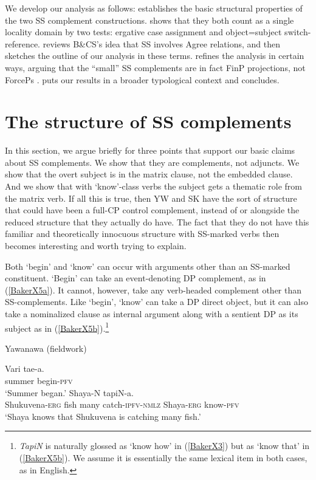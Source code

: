 \documentclass[output=paper]{langscibook}
\begin{document}
We develop our analysis as follows:  establishes the basic structural properties of the two SS complement constructions.  shows that they both count as a single locality domain by two tests: ergative case assignment and object=subject switch-re\-fer\-ence.  reviews B\&CS’s idea that SS involves Agree relations, and then sketches the outline of our analysis in these terms.  refines the analysis in certain ways, arguing that the “small” SS complements are in fact FinP projections, not ForcePs \citep{rizzi1997fine}.  puts our results in a broader typological context and concludes.

\section{The structure of SS complements}\label{sec:baker:2}

In this section, we argue briefly for three points that support our basic claims about SS complements. We show that they are complements, not adjuncts. We show that the overt subject is in the matrix clause, not the embedded clause. And we show that with `know’-class verbs the subject gets a thematic role from the matrix verb. If all this is true, then YW and SK have the sort of structure that could have been a full-CP control complement, instead of or alongside the reduced structure that they actually do have. The fact that they do not have this familiar and theoretically innocuous structure with SS-marked verbs then becomes interesting and worth trying to explain.

Both `begin’ and `know’ can occur with arguments other than an SS-marked constituent. `Begin’ can take an event-denoting DP complement, as in (\ref{BakerX5a}). It cannot, however, take any verb-headed complement other than SS-complements. Like `begin’, `know’ can take a DP direct object, but it can also take a nominalized clause as internal argument along with a sentient DP as its subject as in (\ref{BakerX5b}).\footnote{\textit{TapiN} is naturally glossed as `know how’ in (\ref{BakerX3}) but as `know that’ in (\ref{BakerX5b}). We assume it is essentially the same lexical item in both cases, as in English.}

\begin{exe}
    \ex Yawanawa (fieldwork) \label{BakerX5}
	    \begin{xlist}
			\ex \label{BakerX5a}
			\gll Vari tae-a.\\
			     summer begin-\textsc{pfv}\\
			    \glt `Summer began.'
			\ex \label{BakerX5b}
			 Shaya-N tapiN-a.\\
    			 Shukuvena-\textsc{erg} fish many catch-\textsc{ipfv-nmlz} Shaya-\textsc{erg} know-\textsc{pfv}\\
			    \glt `Shaya knows that Shukuvena is catching many fish.'
		\end{xlist}
\end{exe}
\end{document}
